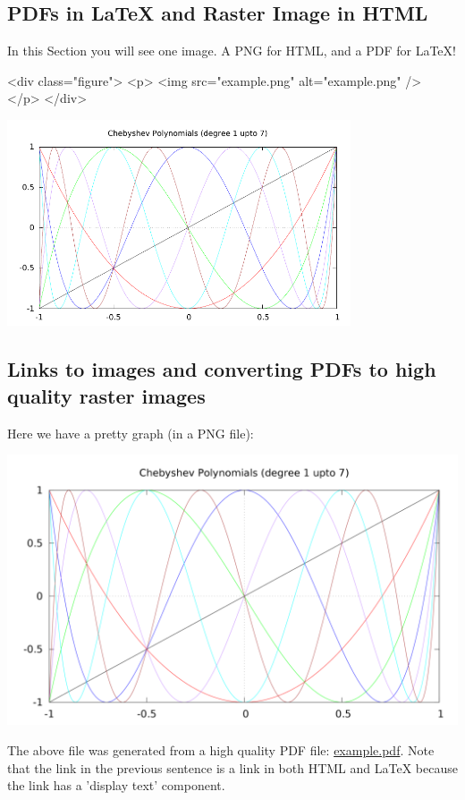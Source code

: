\documentclass[11pt]{article}
\begin{document}
\subsection{PDFs in \LaTeX{} and Raster Image in HTML}
\label{sec:org2f0c7e3}

In this Section you will see one image.  A PNG for HTML, and a PDF for \LaTeX{}!

\begin{HTML}
<div class="figure">
 <p>
   <img src="example.png" alt="example.png" />
 </p>
</div>
\end{HTML}

\includegraphics[width=4in]{example.pdf}

\subsection{Links to images and converting PDFs to high quality raster images}
\label{sec:org258244e}

Here we have a pretty graph (in a PNG file):

\begin{center}
\includegraphics[width=.9\linewidth]{example.png}
\end{center}

The above file was generated from a high quality PDF file: \href{example.pdf}{example.pdf}. Note that the link in the previous sentence is a link in both HTML and \LaTeX{} because
the link has a 'display text' component.
\end{document}
